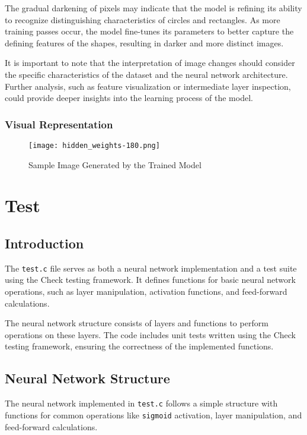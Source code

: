 \documentclass{article}
\begin{document}
The gradual darkening of pixels may indicate that the model is refining its ability to recognize distinguishing characteristics of circles and rectangles. As more training passes occur, the model fine-tunes its parameters to better capture the defining features of the shapes, resulting in darker and more distinct images.

It is important to note that the interpretation of image changes should consider the specific characteristics of the dataset and the neural network architecture. Further analysis, such as feature visualization or intermediate layer inspection, could provide deeper insights into the learning process of the model.

\subsubsection*{Visual Representation}
\begin{figure}[H]
    \centering
    \texttt{[image: hidden\_weights-180.png]}
    \caption{Sample Image Generated by the Trained Model}
    \label{fig:trained_model_image}
\end{figure}



\section{Test}
\subsection{Introduction}
The \texttt{test.c} file serves as both a neural network implementation and a test suite using the Check testing framework. It defines functions for basic neural network operations, such as layer manipulation, activation functions, and feed-forward calculations.

The neural network structure consists of layers and functions to perform operations on these layers. The code includes unit tests written using the Check testing framework, ensuring the correctness of the implemented functions.

\subsection{Neural Network Structure}
The neural network implemented in \texttt{test.c} follows a simple structure with functions for common operations like \texttt{sigmoid} activation, layer manipulation, and feed-forward calculations.
\end{document}

